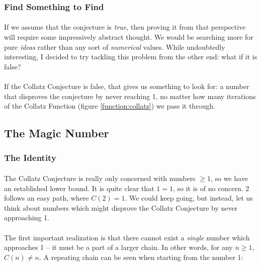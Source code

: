 \documentclass[12pt,letterpaper]{article}
\begin{document}
			\subsubsection{Find Something to Find}
			
				\paragraph{} If we assume that the conjecture is \textit{true}, then proving it from that perspective will require some impressively abstract thought. We would be searching more for pure \textit{ideas} rather than any sort of \textit{numerical} values. While undoubtedly interesting, I decided to try tackling this problem from the other end: what if it is false?
				
				\paragraph{} If the Collatz Conjecture is false, that gives us something to look for: a number that disproves the conjecture by never reaching 1, no matter how many iterations of the Collatz Function (figure \ref{function:collatz}) we pass it through.
				
		\subsection{The Magic Number}
		
			\subsubsection{The Identity}
				
				\paragraph{} The Collatz Conjecture is really only concerned with numbers $\geqslant 1$, so we have an established lower bound. It is quite clear that $1 = 1$, so it is of no concern. 2 follows an easy path, where $C(2) = 1$. We could keep going, but instead, let us think about numbers which might disprove the Collatz Conjecture by never approaching 1.
				
				\paragraph{} The first important realization is that there cannot exist a \textit{single} number which approaches 1 -- it must be a part of a larger chain. In other words, for any $n \geqslant 1$, $C(n) \neq n$. A repeating chain can be seen when starting from the number 1:
				
\end{document}
